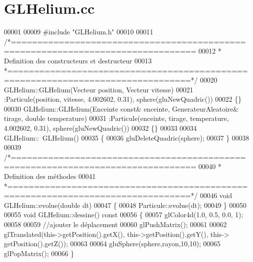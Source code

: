 \section{G\+L\+Helium.\+cc}
\label{_g_l_helium_8cc_source}

\begin{DoxyCode}
00001 
00009 \textcolor{preprocessor}{#include "GLHelium.h"}
00010 
00011 \textcolor{comment}{/*================================================================================}
00012 \textcolor{comment}{ * Definition des constructeurs et destructeur}
00013 \textcolor{comment}{ *================================================================================*/}
00020 GLHelium::GLHelium(Vecteur position, Vecteur vitesse)
00021 :Particule(position, vitesse, 4.002602, 0.31), sphere(gluNewQuadric())
00022 \{\}
00030 GLHelium::GLHelium(Enceinte \textcolor{keyword}{const}& enceinte, GenerateurAleatoire& tirage, \textcolor{keywordtype}{double} temperature)
00031 :Particule(enceinte, tirage, temperature, 4.002602, 0.31), sphere(gluNewQuadric())
00032 \{\}
00033 
00034 GLHelium::~GLHelium() 
00035 \{ 
00036     gluDeleteQuadric(sphere); 
00037 \}
00038 
00039 \textcolor{comment}{/*================================================================================}
00040 \textcolor{comment}{ * Definition des méthodes }
00041 \textcolor{comment}{ *================================================================================*/}
00046 \textcolor{keywordtype}{void} GLHelium::evolue(\textcolor{keywordtype}{double} dt)
00047 \{
00048     Particule::evolue(dt);
00049 \}
00050 
00055 \textcolor{keywordtype}{void} GLHelium::dessine()\textcolor{keyword}{ const}
00056 \textcolor{keyword}{}\{   
00057     glColor4d(1.0, 0.5, 0.0, 1);  
00058 
00059     \textcolor{comment}{//ajouter le déplacement}
00060     glPushMatrix();
00061     
00062     glTranslated(this->getPosition().getX(), this->getPosition().getY(), this->
      getPosition().getZ());
00063     
00064     gluSphere(sphere,rayon,10,10); 
00065     glPopMatrix();
00066 \}
\end{DoxyCode}
